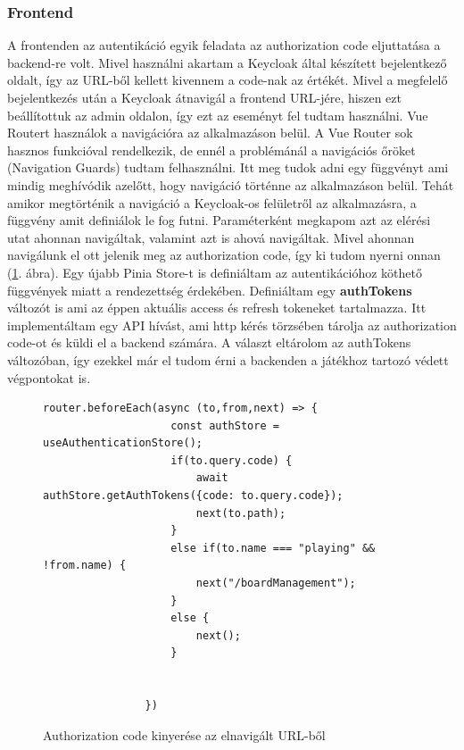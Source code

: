 \documentclass[a4paper,twoside]{article}
\begin{document}
\subsubsection{Frontend} \label{aut-frontend}
A frontenden az autentikáció egyik feladata az authorization code eljuttatása a backend-re volt. Mivel használni akartam a Keycloak által 
készített bejelentkező oldalt, így az URL-ből kellett kivennem a code-nak az értékét. Mivel a megfelelő bejelentkezés után a Keycloak átnavigál a frontend 
URL-jére, hiszen ezt beállítottuk az admin oldalon, így ezt az eseményt fel tudtam használni. Vue Routert használok a navigációra az alkalmazáson belül. A Vue Router 
sok hasznos funkcióval rendelkezik, de ennél a problémánál a navigációs őröket (Navigation Guards) tudtam felhasználni. Itt meg tudok adni egy függvényt ami
mindig meghívódik azelőtt, hogy navigáció történne az alkalmazáson belül. Tehát amikor megtörténik a navigáció a Keycloak-os felületről az alkalmazásra, a függvény amit 
definiálok le fog futni. Paraméterként megkapom azt az elérési utat ahonnan navigáltak, valamint azt is ahová navigáltak. Mivel ahonnan navigálunk el ott jelenik meg az
authorization code, így ki tudom nyerni onnan (\ref{authCode}. ábra). Egy újabb Pinia Store-t is definiáltam az autentikációhoz köthető függvények miatt a rendezettség érdekében. Definiáltam egy \textbf{authTokens} változót is ami az éppen aktuális access és refresh tokeneket tartalmazza. Itt implementáltam egy API hívást, ami http kérés törzsében tárolja az authorization code-ot és küldi el a backend számára. A választ eltárolom az authTokens változóban, így ezekkel már el tudom érni a backenden a játékhoz tartozó védett végpontokat is. 
\begin{figure}
	\caption{Authorization code kinyerése az elnavigált URL-ből}

		\begin{minipage}{\textwidth}
			\begin{lstlisting}[style=javascriptStyle]
				router.beforeEach(async (to,from,next) => {
					const authStore = useAuthenticationStore();
					if(to.query.code) {
						await authStore.getAuthTokens({code: to.query.code});
						next(to.path);
					}
					else if(to.name === "playing" && !from.name) {
						next("/boardManagement");
					}
					else {
						next();
					}
					
					
				})
			\end{lstlisting}
		\end{minipage}
	
	\label{authCode}
\end{figure}
\FloatBarrier
\end{document}
